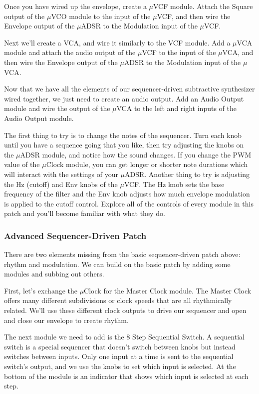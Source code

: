 \documentclass[11pt]{book}
\begin{document}
Once you have wired up the envelope, create a $\mu$VCF module. Attach the Square output of the $\mu$VCO module to the input of the $\mu$VCF, and then wire the Envelope output of the $\mu$ADSR to the Modulation input of the $\mu$VCF.

Next we'll create a VCA, and wire it similarly to the VCF module. Add a $\mu$VCA module and attach the audio output of the $\mu$VCF to the input of the $\mu$VCA, and then wire the Envelope output of the $\mu$ADSR to the Modulation input of the $\mu$VCA.

Now that we have all the elements of our sequencer-driven subtractive synthesizer wired together, we just need to create an audio output. Add an Audio Output module and wire the output of the $\mu$VCA to the left and right inputs of the Audio Output module.

The first thing to try is to change the notes of the sequencer. Turn each knob until you have a sequence going that you like, then try adjusting the knobs on the $\mu$ADSR module, and notice how the sound changes. If you change the PWM value of the $\mu$Clock module, you can get longer or shorter note durations which will interact with the settings of your $\mu$ADSR. Another thing to try is adjusting the Hz (cutoff) and Env knobs of the $\mu$VCF. The Hz knob sets the base frequency of the filter and the Env knob adjusts how much envelope modulation is applied to the cutoff control. Explore all of the controls of every module in this patch and you'll become familiar with what they do.

\subsubsection{Advanced Sequencer-Driven Patch}

There are two elements missing from the basic sequencer-driven patch above: rhythm and modulation. We can build on the basic patch by adding some modules and subbing out others.

First, let's exchange the $\mu$Clock for the Master Clock module. The Master Clock offers many different subdivisions or clock speeds that are all rhythmically related. We'll use these different clock outputs to drive our sequencer and open and close our envelope to create rhythm.

The next module we need to add is the 8 Step Sequential Switch. A sequential switch is a special sequencer that doesn't switch between knobs but instead switches between inputs. Only one input at a time is sent to the sequential switch's output, and we use the knobs to set which input is selected. At the bottom of the module is an indicator that shows which input is selected at each step.
\end{document}
